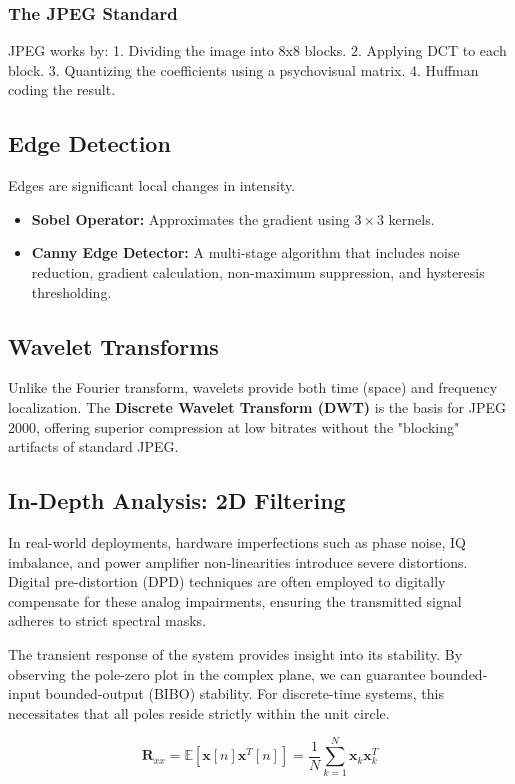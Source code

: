 \subsubsection{The JPEG Standard}
JPEG works by:
1. Dividing the image into 8x8 blocks.
2. Applying DCT to each block.
3. Quantizing the coefficients using a psychovisual matrix.
4. Huffman coding the result.

\subsection{Edge Detection}
Edges are significant local changes in intensity.
\begin{itemize}
    \item \textbf{Sobel Operator:} Approximates the gradient using $3 \times 3$ kernels.
    \item \textbf{Canny Edge Detector:} A multi-stage algorithm that includes noise reduction, gradient calculation, non-maximum suppression, and hysteresis thresholding.
\end{itemize}

\subsection{Wavelet Transforms}
Unlike the Fourier transform, wavelets provide both time (space) and frequency localization. The \textbf{Discrete Wavelet Transform (DWT)} is the basis for JPEG 2000, offering superior compression at low bitrates without the "blocking" artifacts of standard JPEG.

\subsection{In-Depth Analysis: 2D Filtering}
In real-world deployments, hardware imperfections such as phase noise, IQ imbalance, and power amplifier non-linearities introduce severe distortions. Digital pre-distortion (DPD) techniques are often employed to digitally compensate for these analog impairments, ensuring the transmitted signal adheres to strict spectral masks.

The transient response of the system provides insight into its stability. By observing the pole-zero plot in the complex plane, we can guarantee bounded-input bounded-output (BIBO) stability. For discrete-time systems, this necessitates that all poles reside strictly within the unit circle.

\begin{equation}
    \mathbf{R}_{xx} = \mathbb{E}[\mathbf{x}[n]\mathbf{x}^T[n]] = \frac{1}{N} \sum_{k=1}^{N} \mathbf{x}_k \mathbf{x}_k^T
\end{equation}

